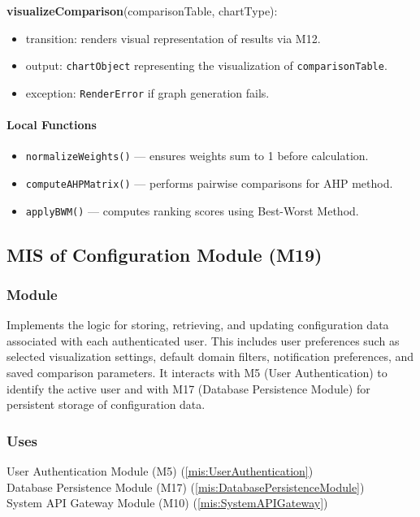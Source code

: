 \documentclass[12pt, titlepage]{article}
\begin{document}
\noindent \textbf{visualizeComparison}(comparisonTable, chartType):
\begin{itemize}
  \item transition: renders visual representation of results via M12.
  \item output: \texttt{chartObject} representing the visualization of \texttt{comparisonTable}.
  \item exception: \texttt{RenderError} if graph generation fails.
\end{itemize}

\paragraph{Local Functions}
\begin{itemize}
  \item \texttt{normalizeWeights()} — ensures weights sum to 1 before calculation.
  \item \texttt{computeAHPMatrix()} — performs pairwise comparisons for AHP method.
  \item \texttt{applyBWM()} — computes ranking scores using Best-Worst Method.
\end{itemize}


\subsection{MIS of Configuration Module (M19)}
\label{mis:Configuration}

\subsubsection{Module}
Implements the logic for storing, retrieving, and updating configuration data associated with each authenticated user.
This includes user preferences such as selected visualization settings, default domain filters, notification preferences, and saved comparison parameters.
It interacts with M5 (User Authentication) to identify the active user and with M17 (Database Persistence Module) for persistent storage of configuration data.

\subsubsection{Uses}
User Authentication Module (M5)  (\ref{mis:UserAuthentication})\\
Database Persistence Module (M17) (\ref{mis:DatabasePersistenceModule})\\
System API Gateway Module (M10)  (\ref{mis:SystemAPIGateway})
\end{document}
